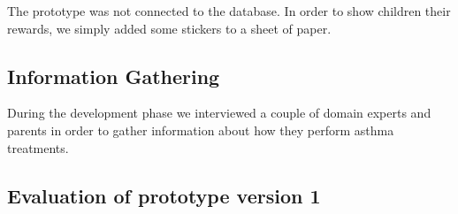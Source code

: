 The prototype was not connected to the database. In order to show children their rewards, we simply added some stickers to a sheet of paper. 



\subsection{Information Gathering}

During the development phase we interviewed a couple of domain experts and parents in order to gather information about how they perform asthma treatments. 

\subsection{Evaluation of prototype version 1}


